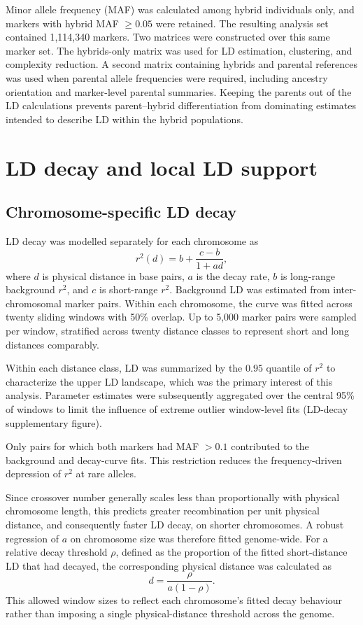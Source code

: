 \documentclass[11pt]{article}
\begin{document}
Minor allele frequency (MAF) was calculated among hybrid individuals only, and
markers with hybrid MAF \(\geq 0.05\) were retained. The resulting analysis set
contained 1,114,340 markers. Two matrices were constructed over this same
marker set. The hybrids-only matrix was used for LD estimation, clustering, and
complexity reduction. A second matrix containing hybrids and parental
references was used when parental allele frequencies were required, including
ancestry orientation and marker-level parental summaries. Keeping the parents
out of the LD calculations prevents parent--hybrid differentiation from dominating
estimates intended to describe LD within the hybrid populations.

\section{LD decay and local LD support}

\subsection{Chromosome-specific LD decay}

LD decay was modelled separately for each chromosome as
\begin{equation}
  r^2(d) = b + \frac{c-b}{1+a d},
  \label{eq:lddecay}
\end{equation}
where \(d\) is physical distance in base pairs, \(a\) is the decay rate,
\(b\) is long-range background \(r^2\), and \(c\) is short-range \(r^2\).
Background LD was estimated from inter-chromosomal marker pairs. Within each
chromosome, the curve was fitted across twenty sliding windows with 50\%
overlap. Up to 5,000 marker pairs were sampled per window, stratified across
twenty distance classes to represent short and long distances comparably.

Within each distance class, LD was summarized by the \(0.95\) quantile of \(r^2\) to characterize the upper LD landscape, which was the primary interest of this analysis. Parameter estimates were subsequently aggregated over the central 95\% of windows to limit the influence of extreme outlier window-level fits (LD-decay supplementary figure).

Only pairs for which both markers had MAF \(>0.1\) contributed to the
background and decay-curve fits. This restriction reduces the frequency-driven
depression of \(r^2\) at rare alleles.

Since crossover number generally scales less than proportionally with physical chromosome length, this predicts  greater recombination per unit physical distance, and consequently faster LD decay, on shorter chromosomes. A robust regression of \(a\) on
chromosome size was therefore fitted genome-wide. For a relative decay threshold \(\rho\), defined as the proportion of the fitted short-distance LD that had decayed, the corresponding physical distance was calculated as
\begin{equation}
  d = \frac{\rho}{a(1-\rho)}.
  \label{eq:distance}
\end{equation}
 This allowed window sizes to reflect each chromosome's fitted decay behaviour rather than imposing a single physical-distance threshold across the genome.
\end{document}
